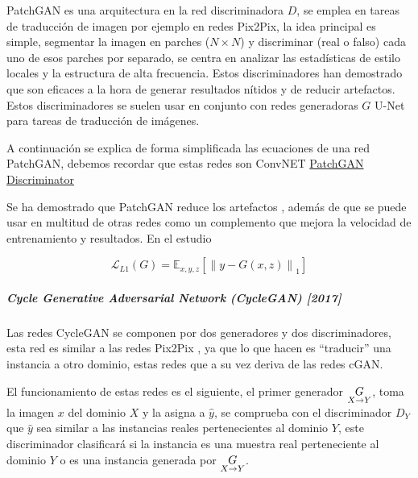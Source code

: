 \gls{PatchGAN} \cite{PatchGAN-isola2018imagetoimage} es una arquitectura en la red discriminadora ${D}$, se emplea en tareas de traducción de imagen por ejemplo en redes \gls{Pix2Pix}, la idea principal es simple, segmentar la imagen en parches (${N \times N}$) y discriminar (real o falso) cada uno de esos parches por separado, se centra en analizar las estadísticas de estilo locales y la estructura de alta frecuencia. Estos discriminadores han demostrado que son eficaces a la hora de generar resultados nítidos y de reducir artefactos. Estos discriminadores se suelen usar en conjunto con redes generadoras ${G}$ \gls{U-Net} \cite{U-Net-ronneberger2015unet} para tareas de traducción de imágenes.

A continuación se explica de forma simplificada las ecuaciones de una red \acrshort{PatchGAN}, debemos recordar que estas redes son \acrshort{ConvNET} \href{https://github.com/junyanz/pytorch-CycleGAN-and-pix2pix/issues/39}{PatchGAN Discriminator}

Se ha demostrado que \gls{PatchGAN} reduce los artefactos \cite{PatchGAN-isola2018imagetoimage}, además de que se puede usar en multitud de otras redes como un complemento que mejora la velocidad de entrenamiento y resultados. En el estudio

\begin{equation}
    \mathcal{L}_{L1}(G) = \mathbb{E}_{x,y,z} \left[ {\lVert y - G(x,z) \rVert}_{1} \right]
    \label{eq:L1}
\end{equation}

\subparagraph*{Cycle Generative Adversarial Network (CycleGAN) [2017]}
Las redes \gls{CycleGAN} \cite{CycleGAN-zhu2020unpaired,CycleGAN-caleb2021Unpaired,CycleGAN-theiler2019thebeautyofcyclegan} se componen por dos generadores y dos discriminadores, esta red es similar a las redes \gls{Pix2Pix} \cite{pix2pix-isola2018imagetoimage}, ya que lo que hacen es ``traducir'' una instancia a otro dominio, estas redes que a su vez deriva de las redes \gls{cGAN}.

El funcionamiento de estas redes es el siguiente, el primer generador ${\underset{X\rightarrow{}Y}{G}}$, toma la imagen ${x}$ del dominio ${X}$ y la asigna a ${\hat{y}}$, se comprueba con el discriminador ${D_{Y}}$ que ${\hat{y}}$ sea similar a las instancias reales pertenecientes al dominio ${Y}$, este discriminador clasificará si la instancia es una muestra real perteneciente al dominio ${Y}$ o es una instancia generada por ${\underset{X\rightarrow{}Y}{G}}$.

